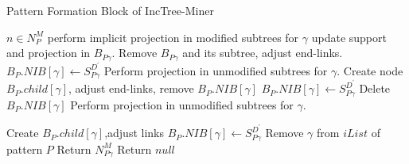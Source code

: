 \begin{algorithm}[!thb]
      \scriptsize
      \caption{Pattern Formation Block of IncTree-Miner}
      \label{algorithm:pattern_formation_inctree_miner}
      \begin{algorithmic}[1]
           \State \forall $n \in N_{P}^{M}$ perform implicit projection in modified subtrees for $\gamma$
           \State {}
                 update support and projection in $B_{P\gamma}$.
                \Else  {}
                    \State Remove $B_{P\gamma}$ and its subtree, adjust end-links.
                    \State {}
                    \State $B_{P}.NIB[\gamma] \gets S_{P\gamma}^{D^{\prime}}$ 
                    \EndIf 
                \EndIf
                \State {}
                    \State Perform projection in unmodified subtrees for $\gamma$.
                    \State Create node $B_{P}.child[\gamma]$, adjust end-links, remove  $B_{P}.NIB[\gamma]$
                \Else {}
                        \State $B_{P}.NIB[\gamma]\gets S_{P\gamma}^{D^{\prime}}$
                    \Else {}
                        \State \text{ }Delete  $B_{P}.NIB[\gamma]$ 
                    \EndIf
                \EndIf
                    \State  {}
                    \State Perform projection in unmodified subtrees for $\gamma$. 
                    
                    \State Create $B_{P}.child[\gamma]$,adjust links
                    \Else {}
                            \State $B_{P}.NIB[\gamma] \gets S_{P\gamma}^{D^{\prime}}$
                        \EndIf
                            \State {}
                            \State Remove $\gamma$ from $iList$ of pattern $P$
                        \EndIf
                    \EndIf
                \EndIf
            \EndIf
            \State{}
            \State Return $N_{P\gamma}^{M}$ 
        \Else \text{ }Return $null$
        \EndIf
        \EndProcedure
      \end{algorithmic}
\end{algorithm}

